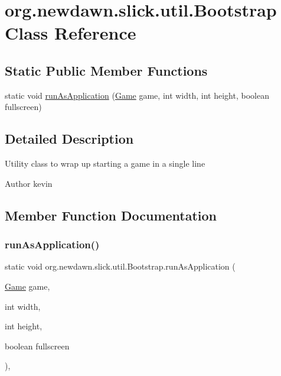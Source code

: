 \hypertarget{classorg_1_1newdawn_1_1slick_1_1util_1_1_bootstrap}{}\section{org.\+newdawn.\+slick.\+util.\+Bootstrap Class Reference}
\label{classorg_1_1newdawn_1_1slick_1_1util_1_1_bootstrap}
\subsection*{Static Public Member Functions}
\begin{DoxyCompactItemize}
\item 
static void \mbox{\hyperlink{classorg_1_1newdawn_1_1slick_1_1util_1_1_bootstrap_a8844195f1dea3d19398094e9c274ef5c}{run\+As\+Application}} (\mbox{\hyperlink{interfaceorg_1_1newdawn_1_1slick_1_1_game}{Game}} game, int width, int height, boolean fullscreen)
\end{DoxyCompactItemize}


\subsection{Detailed Description}
Utility class to wrap up starting a game in a single line

\begin{DoxyAuthor}{Author}
kevin 
\end{DoxyAuthor}


\subsection{Member Function Documentation}
\mbox{\label{classorg_1_1newdawn_1_1slick_1_1util_1_1_bootstrap_a8844195f1dea3d19398094e9c274ef5c}} 
\subsubsection{\texorpdfstring{run\+As\+Application()}{runAsApplication()}}
{\footnotesize\ttfamily static void org.\+newdawn.\+slick.\+util.\+Bootstrap.\+run\+As\+Application (\begin{DoxyParamCaption}\item[{\mbox{\hyperlink{interfaceorg_1_1newdawn_1_1slick_1_1_game}{Game}}}]{game,  }\item[{int}]{width,  }\item[{int}]{height,  }\item[{boolean}]{fullscreen }\end{DoxyParamCaption})\hspace{0.3cm}{\ttfamily [inline]}, {\ttfamily [static]}}

